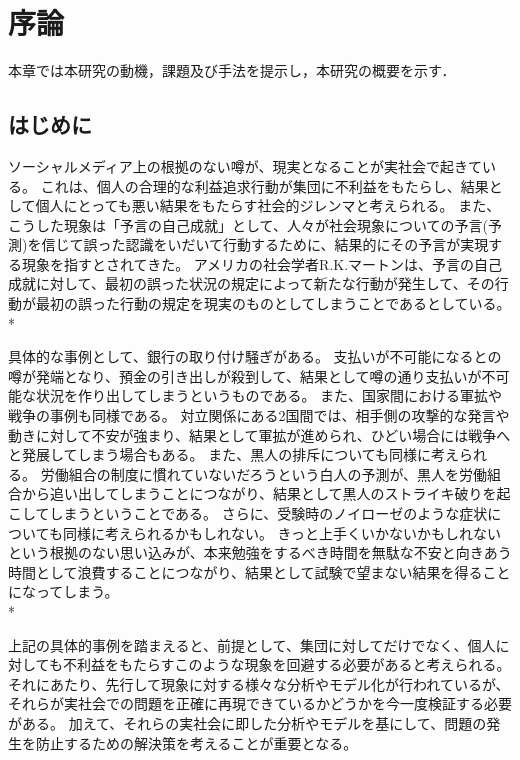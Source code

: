 \chapter{序論}
\label{introduction}

本章では本研究の動機，課題及び手法を提示し，本研究の概要を示す．

\section{はじめに}
\label{introduction:background}

ソーシャルメディア上の根拠のない噂が、現実となることが実社会で起きている。
これは、個人の合理的な利益追求行動が集団に不利益をもたらし、結果として個人にとっても悪い結果をもたらす社会的ジレンマと考えられる。
また、こうした現象は「予言の自己成就」として、人々が社会現象についての予言(予測)を信じて誤った認識をいだいて行動するために、結果的にその予言が実現する現象を指すとされてきた。
アメリカの社会学者R.K.マートンは、予言の自己成就に対して、最初の誤った状況の規定によって新たな行動が発生して、その行動が最初の誤った行動の規定を現実のものとしてしまうことであるとしている。\\*
 
具体的な事例として、銀行の取り付け騒ぎがある。
支払いが不可能になるとの噂が発端となり、預金の引き出しが殺到して、結果として噂の通り支払いが不可能な状況を作り出してしまうというものである。
また、国家間における軍拡や戦争の事例も同様である。
対立関係にある2国間では、相手側の攻撃的な発言や動きに対して不安が強まり、結果として軍拡が進められ、ひどい場合には戦争へと発展してしまう場合もある。
また、黒人の排斥についても同様に考えられる。
労働組合の制度に慣れていないだろうという白人の予測が、黒人を労働組合から追い出してしまうことにつながり、結果として黒人のストライキ破りを起こしてしまうということである。
さらに、受験時のノイローゼのような症状についても同様に考えられるかもしれない。
きっと上手くいかないかもしれないという根拠のない思い込みが、本来勉強をするべき時間を無駄な不安と向きあう時間として浪費することにつながり、結果として試験で望まない結果を得ることになってしまう。\\*
 
上記の具体的事例を踏まえると、前提として、集団に対してだけでなく、個人に対しても不利益をもたらすこのような現象を回避する必要があると考えられる。
それにあたり、先行して現象に対する様々な分析やモデル化が行われているが、それらが実社会での問題を正確に再現できているかどうかを今一度検証する必要がある。
加えて、それらの実社会に即した分析やモデルを基にして、問題の発生を防止するための解決策を考えることが重要となる。

